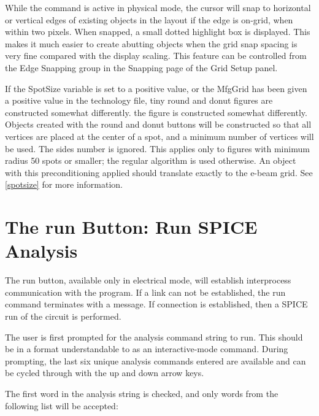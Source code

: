 While the command is active in physical mode, the cursor will snap to
horizontal or vertical edges of existing objects in the layout if the
edge is on-grid, when within two pixels.  When snapped, a small dotted
highlight box is displayed.  This makes it much easier to create
abutting objects when the grid snap spacing is very fine compared with
the display scaling.  This feature can be controlled from the {\cb
Edge Snapping} group in the {\cb Snapping} page of the {\cb Grid
Setup} panel.

If the {\et SpotSize} variable is set to a positive value, or the {\vt
MfgGrid} has been given a positive value in the technology file, tiny
round and donut figures are constructed somewhat differently.  the
figure is constructed somewhat differently.  Objects created with the
{\cb round} and {\cb donut} buttons will be constructed so that all
vertices are placed at the center of a spot, and a minimum number of
vertices will be used.  The {\cb sides} number is ignored.  This
applies only to figures with minimum radius 50 spots or smaller; the
regular algorithm is used otherwise.  An object with this
preconditioning applied should translate exactly to the e-beam grid. 
See \ref{spotsize} for more information.


\section{The {\cb run} Button: Run SPICE Analysis}

The {\cb run} button, available only in electrical mode, will
establish interprocess communication with the {\WRspice} program.  If
a link can not be established, the {\cb run} command terminates with a
message.  If connection is established, then a SPICE run of the
circuit is performed.

The user is first prompted for the {\WRspice} analysis command string
to run.  This should be in a format understandable to {\WRspice} as an
interactive-mode command.  During prompting, the last six unique
analysis commands entered are available and can be cycled through with
the up and down arrow keys.
 
The first word in the analysis string is checked, and only words from
the following list will be accepted:
 
